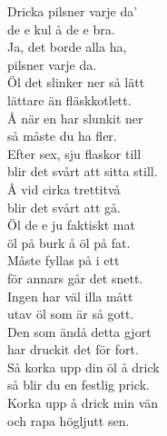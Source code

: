 \documentclass[a6paper,10pt]{article}
\begin{document}
\setlength{\oddsidemargin}{-0.47in}
\begin{center}
\end{center}
\begin{lyrics}
Dricka pilsner varje da'\\
de e kul å de e bra.\\
Ja, det borde alla ha,\\
pilsner varje da.
\vspace{5pt}\\
Öl det slinker ner så lätt\\
lättare än fläskkotlett.\\
Å när en har slunkit ner\\
så måste du ha fler.
\vspace{5pt}\\
Efter sex, sju flaskor till\\
blir det svårt att sitta still.\\
Å vid cirka trettitvå\\
blir det svårt att gå.
\vspace{5pt}\\
Öl de e ju faktiskt mat\\
öl på burk å öl på fat.\\
Måste fyllas på i ett\\
för annars går det snett.
\vspace{5pt}\\
Ingen har väl illa mått\\
utav öl som är så gott.\\
Den som ändå detta gjort\\
har druckit det för fort.
\vspace{5pt}\\
Så korka upp din öl å drick\\
så blir du en festlig prick.\\
Korka upp å drick min vän\\
och rapa högljutt sen.
\end{lyrics}
\end{document}
